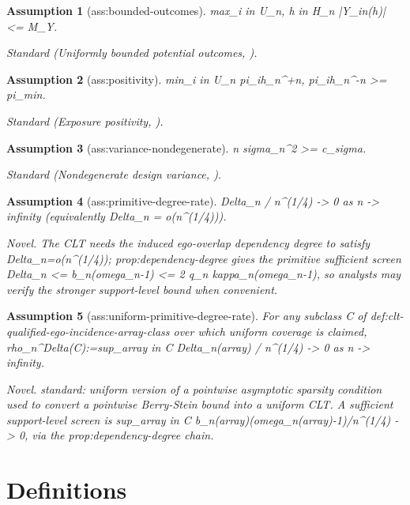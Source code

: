 \documentclass{article}
\newtheorem{assumption}{Assumption}
\begin{document}
\begin{assumption}[ass:bounded-outcomes]\label{ass:bounded-outcomes}
max_{i in U_n, h in H_n} |Y_in(h)| <= M_Y.
\par\smallskip\noindent\emph{Standard} (Uniformly bounded potential outcomes, \cite{AronowSamii2017}).
\end{assumption}

\begin{assumption}[ass:positivity]\label{ass:positivity}
min_{i in U_n} { pi_ih_n^+n, pi_ih_n^-n } >= pi_min.
\par\smallskip\noindent\emph{Standard} (Exposure positivity, \cite{AronowSamii2017}).
\end{assumption}

\begin{assumption}[ass:variance-nondegenerate]\label{ass:variance-nondegenerate}
n sigma_n^2 >= c_sigma.
\par\smallskip\noindent\emph{Standard} (Nondegenerate design variance, \cite{Chin2018}).
\end{assumption}

\begin{assumption}[ass:primitive-degree-rate]\label{ass:primitive-degree-rate}
Delta_n / n^(1/4) -> 0 as n -> infinity (equivalently Delta_n = o(n^(1/4))).
\par\smallskip\noindent\emph{Novel.} The CLT needs the induced ego-overlap dependency degree to satisfy Delta_n=o(n^(1/4)); prop:dependency-degree gives the primitive sufficient screen Delta_n <= b_n(omega_n-1) <= 2 q_n kappa_n(omega_n-1), so analysts may verify the stronger support-level bound when convenient.
\end{assumption}

\begin{assumption}[ass:uniform-primitive-degree-rate]\label{ass:uniform-primitive-degree-rate}
For any subclass C of def:clt-qualified-ego-incidence-array-class over which uniform coverage is claimed, rho_n^Delta(C):=sup_{array in C} Delta_n(array) / n^(1/4) -> 0 as n -> infinity.
\par\smallskip\noindent\emph{Novel.} standard: uniform version of a pointwise asymptotic sparsity condition used to convert a pointwise Berry-Stein bound into a uniform CLT. A sufficient support-level screen is sup_{array in C} b_n(array)(omega_n(array)-1)/n^(1/4) -> 0, via the prop:dependency-degree chain.
\end{assumption}

\section{Definitions}
\end{document}
